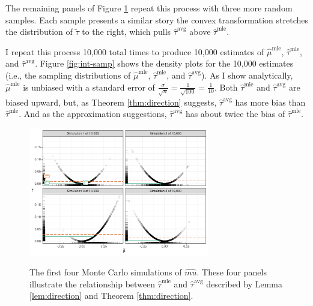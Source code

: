 \documentclass[12pt]{article}
\begin{document}
The remaining panels of Figure \ref{fig:samp} repeat this process with three more random samples.
Each sample presents a similar story \textemdash{} the convex transformation stretches the distribution of $\tilde{\tau}$ to the right, which pulls $\hat{\tau}^\text{avg}$ above $\hat{\tau}^\text{mle}$.

I repeat this process 10,000 total times to produce 10,000 estimates of $\hat{\mu}^\text{mle}$, $\hat{\tau}^\text{mle}$, and $\hat{\tau}^\text{avg}$.
Figure \ref{fig:int-samp} shows the density plots for the 10,000 estimates (i.e., the sampling distributions of $\hat{\mu}^\text{mle}$, $\hat{\tau}^\text{mle}$, and $\hat{\tau}^\text{avg}$).
As I show analytically, $\hat{\mu}^\text{mle}$ is unbiased with a standard error of $\frac{\sigma}{\sqrt{n}} = \frac{1}{\sqrt{100}} = \frac{1}{10}$.
Both $\hat{\tau}^\text{mle}$ and $\hat{\tau}^\text{avg}$ are biased upward, but, as Theorem \ref{thm:direction} suggests, $\hat{\tau}^\text{avg}$ has more bias than $\hat{\tau}^\text{mle}$. And as the approximation suggestions, $\hat{\tau}^\text{avg}$ has about twice the bias of $\hat{\tau}^\text{mle}$.

\begin{figure}[!h]
\begin{center}
\includegraphics[width = 0.7\textwidth]{figs/intuition.pdf}\\
\vspace{.03in}
\caption{The first four Monte Carlo simulations of $\hat{mu}$. These four panels illustrate the relationship between $\hat{\tau}^\text{mle}$ and $\hat{\tau}^\text{avg}$ described by Lemma \ref{lem:direction} and Theorem \ref{thm:direction}.}\label{fig:samp}
\end{center}
\end{figure}
\end{document}
